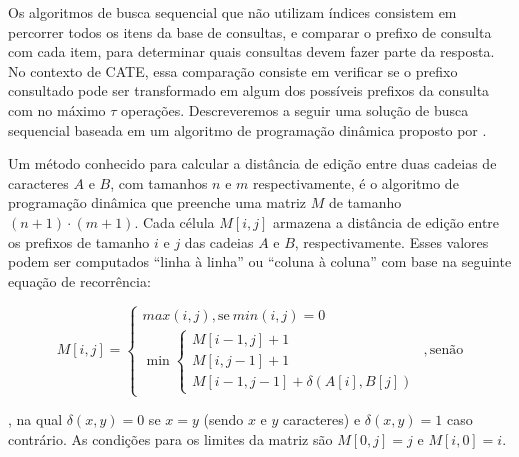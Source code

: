 Os algoritmos de busca sequencial que não utilizam índices consistem em percorrer todos os itens da base de consultas, e comparar o prefixo de consulta com cada item, para determinar quais consultas devem fazer parte da resposta. No contexto de CATE, essa comparação consiste em verificar se o prefixo consultado pode ser transformado em algum dos possíveis prefixos da consulta com no máximo $\tau$ operações. Descreveremos a seguir uma solução de busca sequencial baseada em um algoritmo de programação dinâmica proposto por \cite{levenshtein1966binary}. 

Um método conhecido para calcular a distância de edição entre duas cadeias de caracteres $A$ e $B$, com tamanhos $n$ e $m$ respectivamente, é o algoritmo de programação dinâmica que preenche uma matriz $M$ de tamanho $(n + 1) \cdot (m + 1)$. Cada célula $M[i,j]$ armazena a distância de edição entre os prefixos de tamanho $i$ e $j$ das cadeias $A$ e $B$, respectivamente. Esses valores podem ser computados ``linha à linha'' ou ``coluna à coluna'' com base na seguinte equação de recorrência:


\[ 
M[i,j] =
        \begin{cases}
        max(i, j), \text{se}\ min(i, j) = 0 \\
         \min
         \begin{cases}
         M[i - 1, j]  + 1 \\ 
         M[i, j - 1]  + 1 \\ 
         M[i - 1, j - 1] + \delta(A[i], B[j]) \end{cases}
         \end{cases}, \text{senão}
\]

, na qual $\delta(x,y) = 0$ se $x = y$ (sendo $x$ e $y$ caracteres) e $\delta(x,y) = 1$ caso contrário. As condições para os limites da matriz são $M[0, j] = j$ e $M[i, 0] = i$. 

